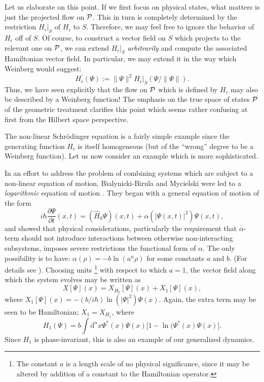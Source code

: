 \documentclass[12pt,aps,eqsecnum,tighten,nofootinbib]{revtex4-2}
\def\be{\begin{equation}}
\def\ee{\end{equation}}
\def\d{{\mathrm d}}
\def\i{{i}}
\def\P{{\cal P}}
\newcommand{\hvf}[1]{{X_{#1}}}
\begin{document}
Let us elaborate on this point. If we first focus on physical states,
what matters is just the projected flow on $\P$. This in turn is
completely determined by the restriction $H_\epsilon \big|_S$ of
$H_\epsilon$ to $S$. Therefore, we may feel free to ignore the
behavior of $H_\epsilon$ off of $S$.  Of course, to construct a vector
field on $S$ which projects to the relevant one on $\P$, we can extend
$H_\epsilon \big|_S$ {\em arbitrarily} and compute the associated
Hamiltonian vector field.  In particular, we may extend it in the way
which Weinberg would suggest:
%
\be H_\epsilon^\prime(\Psi) := \| \Psi \|^2 H_\epsilon 
\big|_S(\Psi / \|\Psi\|).  
\ee 
%
Thus, we have seen explicitly that the flow on $\P$ which is defined
by $H_\epsilon$ may also be described by a Weinberg function! The
emphasis on the true space of states $\P$ of the geometric treatment
clarifies this point which seems rather confusing at first from the 
Hilbert space perspective.

The non-linear Schr\"odinger equation is a fairly simple example since
the generating function $H_\epsilon$ is itself homogeneous (but of the
``wrong'' degree to be a Weinberg function).  Let us now consider an
example which is more sophisticated.

In an effort to address the problem of combining systems which are
subject to a non-linear equation of motion, Bialynicki-Birula and
Mycielski were led to a {\em logarithmic} equation of motion
\cite{birula}. They began with a general equation of motion of the
form
%
\be \label{gen_nonlin}
\i\hbar \frac{\partial \Psi}{\partial t}(x,t) =
(\hat{H}_0\Psi)(x,t) + \alpha( | \Psi(x,t) |^2 ) \Psi(x,t),
\ee
%
and showed that physical considerations, particularly the requirement
that $\alpha$-term should not introduce interactions between otherwise
non-interacting subsystems, imposes severe restrictions the functional
form of $\alpha$. The only possibility is to have: $\alpha(\rho) = -b
\ln(a^n\rho)$ for some constants $a$ and $b$. (For details see
\cite{birula}).  Choosing units%
%
\footnote{The constant $a$ is a length scale of no physical
significance, since it may be altered by addition of a constant to the
Hamiltonian operator.}
%
with respect to which $a=1$, the vector field along which the system
evolves may be written as 
%
\be X[\Psi](x) = \hvf{H_0}[\Psi](x) +X_1[\Psi](x), \ee 
%
where $X_1[\Psi](x) = -(b/\i\hbar) \ln(|\Psi|^2) \Psi(x)$.  Again, the
extra term may be seen to be Hamiltonian; $X_1 = \hvf{H_1}$, where 
%
\be
H_1(\Psi) = b \int \d^n \! x \Psi^*(x) \Psi(x) \big[ 1 - 
\ln(\Psi^*(x) \Psi(x) \big].  
\ee
%
Since $H_1$ is phase-invariant, this is also an example of our
generalized dynamics.
\end{document}
